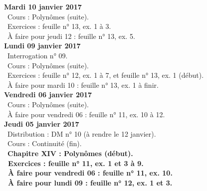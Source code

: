 \documentclass[12pt,a4paper]{article}
\begin{document}
%  
%  
%  

\noindent\textbf{Mardi 10 janvier 2017} \\
\bu\ Cours : Polynômes (suite).\\
\bu\ Exercices : feuille n° 13, ex. 1 à 3.\\
\bu\ À faire pour jeudi 12 : feuille n° 13, ex. 5.\vspace{.4cm}\\
 
\noindent\textbf{ Lundi 09 janvier 2017 } \\
\bu\ Interrogation n° 09.\\
\bu\ Cours : Polynômes (suite).\\
\bu\ Exercices : feuille n° 12, ex. 1 à 7, et feuille n° 13, ex. 1 (début).\\
\bu\ À faire pour mardi 10 : feuille n° 13, ex. 1 à finir.\vspace{.4cm}\\

\noindent\textbf{Vendredi 06 janvier 2017 }\\
\bu\ Cours : Polynômes (suite).\\
\bu\ À faire pour vendredi 06 : feuille n° 11, ex. 10 à 12.\vspace{.4cm}\\

\noindent\textbf{Jeudi 05 janvier 2017 }\\
\bu\ Distribution : DM n° 10 (à rendre le 12 janvier).\\
\bu\ Cours : Continuité (fin).\\
\bu\ \bf Chapitre XIV \rm : Polynômes (début).\\
\bu\ Exercices : feuille n° 11, ex. 1 et 3 à 9.\\
\bu\ À faire pour vendredi 06 : feuille n° 11, ex. 10.\\
\bu\ À faire pour lundi 09 : feuille n° 12, ex. 1 et 3.\vspace{.4cm}\\
\end{document}
